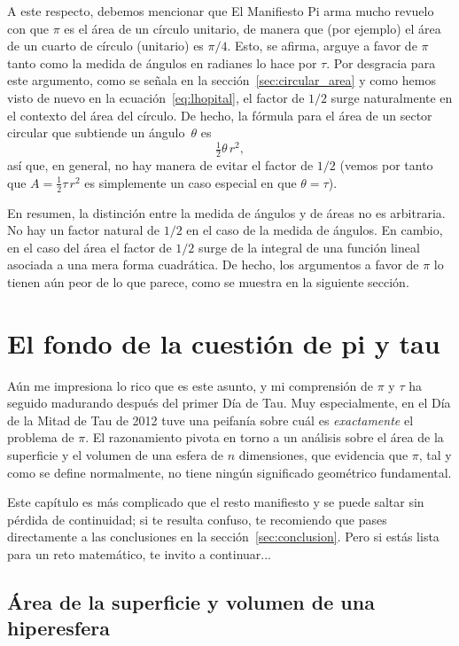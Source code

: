 A este respecto, debemos mencionar que El Manifiesto Pi arma mucho revuelo con que $\pi$ es el área de un círculo unitario, de manera que (por ejemplo) el área de un cuarto de círculo (unitario) es $\pi/4$. Esto, se afirma, arguye a favor de $\pi$ tanto como la medida de ángulos en radianes lo hace por $\tau$. Por desgracia para este argumento, como se señala en la sección~\ref{sec:circular_area} y como hemos visto de nuevo en la ecuación~\eqref{eq:lhopital}, el factor de $1/2$ surge naturalmente en el contexto del área del círculo. De hecho, la fórmula para el área de un sector circular que subtiende un ángulo~$\theta$ es
\[
\tfrac{1}{2}\theta\, r^2,
\]
así que, en general, no hay manera de evitar el factor de $1/2$ (vemos por tanto que $A = \frac{1}{2} \tau\, r^2$ es simplemente un caso especial en que  $\theta = \tau$).

En resumen, la distinción entre la medida de ángulos y de áreas no es arbitraria. No hay un factor natural de $1/2$ en el caso de la medida de ángulos. En cambio, en el caso del área el factor de $1/2$ surge de la integral de una función lineal asociada a una mera forma cuadrática. De hecho, los argumentos a favor de $\pi$ lo tienen aún peor de lo que parece, como se muestra en la siguiente sección.


\section{El fondo de la cuestión de pi y tau} %
\label{sec:getting_to_the_bottom_of_pi}

Aún me impresiona lo rico que es este asunto, y mi comprensión de $\pi$ y $\tau$ ha seguido madurando después del primer Día de Tau. Muy especialmente, en el Día de la Mitad de Tau de 2012 tuve una peifanía sobre cuál es \emph{exactamente} el problema de $\pi$. El razonamiento pivota en torno a un análisis sobre el área de la superficie y el volumen de una esfera de $n$ dimensiones, que evidencia que $\pi$, tal y como se define normalmente, no tiene ningún significado geométrico fundamental. 

Este capítulo es más complicado que el resto manifiesto y se puede saltar sin pérdida de continuidad; si te resulta confuso, te recomiendo que pases directamente a las conclusiones en la sección~\ref{sec:conclusion}. Pero si estás lista para un reto matemático, te invito a continuar...

  \subsection{Área de la superficie y volumen de una hiperesfera} %
  \label{sec:volume_of_a_hypersphere}

